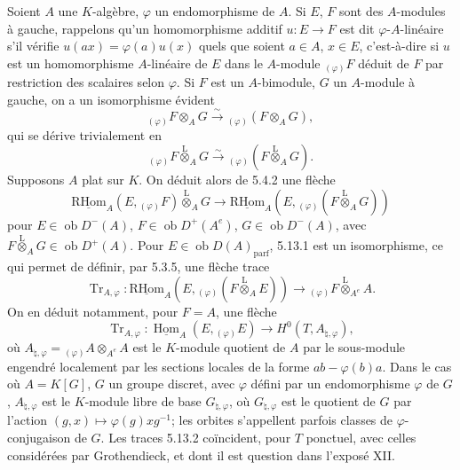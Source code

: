 \documentclass[11pt]{article}
\DeclareMathOperator{\Hom}{Hom}
\newcommand{\R}{\mathrm{R}}\newcommand{\RHomCore}{\mathrm{RHom}}
\newcommand{\ob}{\operatorname{ob}}
\providecommand{\RHom}{\RHomCore}
\providecommand{\uRHom}{\underline{\RHom}}
\providecommand{\uHom}{\underline{\Hom}}
\providecommand{\Tr}{\operatorname{Tr}}
\providecommand{\Tr}{\operatorname{Tr}}
\providecommand{\lten}{\overset{\mathrm L}{\otimes}}
\providecommand{\Tr}{\operatorname{Tr}}
\providecommand{\RHom}{\RHomCore}
\providecommand{\Hom}{\operatorname{Hom}}
\providecommand{\ob}{\operatorname{ob}}
\providecommand{\lten}{\overset{\mathrm L}{\otimes}}
\providecommand{\RHom}{\R\mathcal{H}om}
\providecommand{\lten}{\overset{\mathrm L}{\otimes}}
\providecommand{\R}{\mathrm R}
\providecommand{\Tr}{\operatorname{Tr}}
\providecommand{\lten}{\overset{\mathrm L}{\otimes}}
\providecommand{\lten}{\overset{\mathrm L}{\otimes}}
\providecommand{\lten}{\overset{\mathrm L}{\otimes}}
\providecommand{\RHom}{\RHomCore}
\providecommand{\Hom}{\operatorname{Hom}}
\providecommand{\Tr}{\operatorname{Tr}}
\providecommand{\lten}{\overset{\mathrm L}{\otimes}}
\begin{document}
Soient $A$ une $K$-algèbre, $\varphi$ un endomorphisme de $A$. Si $E$, $F$ sont des $A$-modules à gauche, rappelons qu'un homomorphisme additif $u:E\to F$ est dit $\varphi$-$A$-linéaire s'il vérifie $u(ax)=\varphi(a)u(x)$ quels que soient $a\in A$, $x\in E$, c'est-à-dire si $u$ est un homomorphisme $A$-linéaire de $E$ dans le $A$-module ${}_{(\varphi)}F$ déduit de $F$ par restriction des scalaires selon $\varphi$. Si $F$ est un $A$-bimodule, $G$ un $A$-module à gauche, on a un isomorphisme évident
\[
{}_{(\varphi)}F\otimes_AG\xrightarrow{\sim}{}_{(\varphi)}(F\otimes_AG),
\]
qui se dérive trivialement en
\[
{}_{(\varphi)}F\lten_AG\xrightarrow{\sim}{}_{(\varphi)}(F\lten_AG).
\]
Supposons $A$ plat sur $K$. On déduit alors de 5.4.2 une flèche
\begin{equation}\tag{5.13.1}
\uRHom_A(E,{}_{(\varphi)}F)\lten_AG\longrightarrow\uRHom_A(E,{}_{(\varphi)}(F\lten_AG))
\end{equation}
pour $E\in\ob D^-(A)$, $F\in\ob D^+(A^e)$, $G\in\ob D^-(A)$, avec $F\lten_AG\in\ob D^+(A)$. Pour $E\in\ob D(A)_{\mathrm{parf}}$, 5.13.1 est un isomorphisme, ce qui permet de définir, par 5.3.5, une flèche trace
\begin{equation}\tag{5.13.2}
\Tr_{A,\varphi}:\uRHom_A(E,{}_{(\varphi)}(F\lten_AE))\longrightarrow {}_{(\varphi)}F\lten_{A^e}A.
\end{equation}
On en déduit notamment, pour $F=A$, une flèche
\begin{equation}\tag{5.13.3}
\Tr_{A,\varphi}:\uHom_A(E,{}_{(\varphi)}E)\longrightarrow H^0(T,A_{\natural,\varphi}),
\end{equation}
où $A_{\natural,\varphi}={}_{(\varphi)}A\otimes_{A^e}A$ est le $K$-module quotient de $A$ par le sous-module engendré localement par les sections locales de la forme $ab-\varphi(b)a$. Dans le cas où $A=K[G]$, $G$ un groupe discret, avec $\varphi$ défini par un endomorphisme $\varphi$ de $G$, $A_{\natural,\varphi}$ est le $K$-module libre de base $G_{\natural,\varphi}$, où $G_{\natural,\varphi}$ est le quotient de $G$ par l'action $(g,x)\mapsto\varphi(g)xg^{-1}$; les orbites s'appellent parfois classes de $\varphi$-conjugaison de $G$. Les traces 5.13.2 coïncident, pour $T$ ponctuel, avec celles considérées par Grothendieck, et dont il est question dans l'exposé XII.
\end{document}
